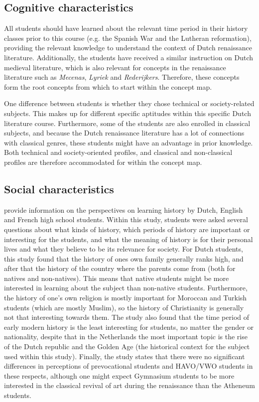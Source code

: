 \subsection{Cognitive characteristics}

All students should have learned about the relevant time period in their history classes prior to this course (e.g. the Spanish War and the Lutheran reformation), providing the relevant knowledge to understand the context of Dutch renaissance literature. Additionally, the students have received a similar instruction on Dutch medieval literature, which is also relevant for concepts in the renaissance literature such as \emph{Mecenas}, \emph{Lyriek} and \emph{Rederijkers}. Therefore, these concepts form the root concepts from which to start within the concept map.

One difference between students is whether they chose technical or society-related subjects. This makes up for different specific aptitudes within this specific Dutch literature course. Furthermore, some of the students are also enrolled in classical subjects, and because the Dutch renaissance literature has a lot of connections with classical genres, these students might have an advantage in prior knowledge. Both technical and society-oriented profiles, and classical and non-classical profiles are therefore accommodated for within the concept map.

\subsection{Social characteristics}
\label{subsec:socialcharacteristics}

 provide information on the perspectives on learning history by Dutch, English and French high school students. Within this study, students were asked several questions about what kinds of history, which periods of history are important or interesting for the students, and what the meaning of history is for their personal lives and what they believe to be its relevance for society. For Dutch students, this study found that the history of ones own family generally ranks high, and after that the history of the country where the parents come from (both for natives and non-natives). This means that native students might be more interested in learning about the subject than non-native students. Furthermore, the history of one's own religion is mostly important for Moroccan and Turkish students (which are mostly Muslim), so the history of Christianity is generally not that interesting towards them. The study also found that the time period of early modern history is the least interesting for students, no matter the gender or nationality, despite that in the Netherlands the most important topic is the rise of the Dutch republic and the Golden Age (the historical context for the subject used within this study). Finally, the study states that there were no significant differences in perceptions of prevocational students and HAVO/VWO students in these respects, although one might expect Gymnasium students to be more interested in the classical revival of art during the renaissance than the Atheneum students.

